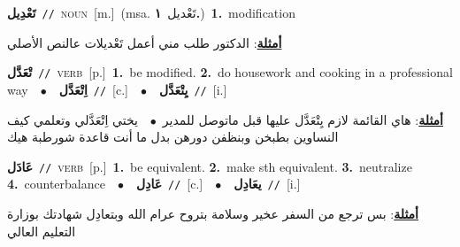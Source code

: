\documentclass[10pt,a4paper,twoside]{article} %
\begin{document}
\begin{multicols}{2}
{\setlength\topsep{0pt}\textbf{\foreignlanguage{arabic}{تَعْدِيل}}\ {\color{gray}\texttt{//}\color{black}}\ \textsc{noun}\ [m.]\ \color{gray}(msa. \foreignlanguage{arabic}{تَعْديل}~\foreignlanguage{arabic}{\textbf{١.}})\color{black}\ \textbf{1.}~modification\  \begin{flushright}\color{gray}\foreignlanguage{arabic}{\textbf{\underline{\foreignlanguage{arabic}{أمثلة}}}: الدكتور طلب مني أعمل تَعْديلات  عالنص الأصلي}\end{flushright}\color{black}} \vspace{2mm}

{\setlength\topsep{0pt}\textbf{\foreignlanguage{arabic}{تْعَدَّل}}\ {\color{gray}\texttt{//}\color{black}}\ \textsc{verb}\ [p.]\ \textbf{1.}~be modified.  \textbf{2.}~do housework and cooking in a professional way\ \ $\bullet$\ \ \setlength\topsep{0pt}\textbf{\foreignlanguage{arabic}{اِتْعَدَّل}}\ {\color{gray}\texttt{//}\color{black}}\ [c.]\ \ $\bullet$\ \ \setlength\topsep{0pt}\textbf{\foreignlanguage{arabic}{يِتْعَدَّل}}\ {\color{gray}\texttt{//}\color{black}}\ [i.]\  \begin{flushright}\color{gray}\foreignlanguage{arabic}{\textbf{\underline{\foreignlanguage{arabic}{أمثلة}}}: هاي القائمة لازم يِتْعَدَّل عليها قبل ماتوصل للمدير\ $\bullet$\ \  يختي اِتْعَدَّلي وتعلمي كيف النساوين بطبخن وبنظفن دورهن بدل ما أنت قاعدة شورطبة هيك}\end{flushright}\color{black}} \vspace{2mm}

{\setlength\topsep{0pt}\textbf{\foreignlanguage{arabic}{عَادَل}}\ {\color{gray}\texttt{//}\color{black}}\ \textsc{verb}\ [p.]\ \textbf{1.}~be equivalent.  \textbf{2.}~make sth equivalent.  \textbf{3.}~neutralize  \textbf{4.}~counterbalance\ \ $\bullet$\ \ \setlength\topsep{0pt}\textbf{\foreignlanguage{arabic}{عَادِل}}\ {\color{gray}\texttt{//}\color{black}}\ [c.]\ \ $\bullet$\ \ \setlength\topsep{0pt}\textbf{\foreignlanguage{arabic}{يعَادِل}}\ {\color{gray}\texttt{//}\color{black}}\ [i.]\  \begin{flushright}\color{gray}\foreignlanguage{arabic}{\textbf{\underline{\foreignlanguage{arabic}{أمثلة}}}: بس ترجع من السفر عخير وسلامة بتروح عرام الله وبتعادِل شهادتك بوزارة التعليم العالي}\end{flushright}\color{black}} \vspace{2mm}


\end{multicols}
\end{document}
